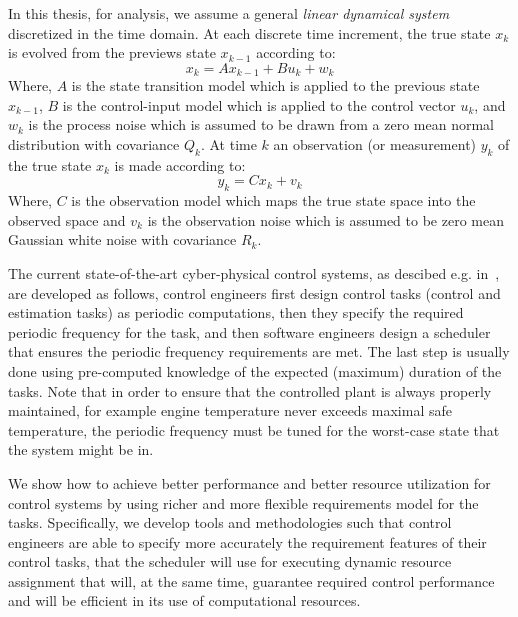 \documentclass[ twoside, 12pt ]{article}
\begin{document}
In this thesis, for analysis, we assume a general \textit{linear dynamical system} discretized in the time domain.
At each discrete time increment, the true state $x_k$ is evolved from the previews state $x_{k-1}$ according to:
$$ x_{k}=Ax_{k-1} + Bu_{k} + w_{k} $$
Where,
$A$ is the state transition model which is applied to the previous state $x_{k−1}$, $B$ is the control-input model which is applied to the control vector $u_k$, and $w_k$ is the process noise which is assumed to be drawn from a zero mean normal distribution with covariance $Q_k$.
At time $k$ an observation (or measurement) $y_k$ of the true state $x_k$ is made according to:
$$y_k=Cx_k+v_k$$
Where,
$C$ is the observation model which maps the true state space into the observed space and $v_k$ is the observation noise which is assumed to be zero mean Gaussian white noise with covariance $R_k$.

The current state-of-the-art cyber-physical control systems, as descibed e.g. in~\cite{Celvin}, are developed as follows, control engineers first design control tasks (control and estimation tasks) as periodic computations, then they specify the required periodic frequency for the task, and then software engineers design a scheduler that ensures the periodic frequency requirements are met. 
The last step is usually done using pre-computed knowledge of the expected (maximum) duration of the tasks.
Note that in order to ensure that the controlled plant is always properly maintained, for example engine temperature never exceeds maximal safe temperature, the periodic frequency must be tuned for the worst-case state that the system might be in.

We show how to achieve better performance and better resource utilization for control systems by using richer and more flexible requirements model for the tasks.
Specifically, we develop tools and methodologies such that control engineers are able to specify more accurately the requirement features of their control tasks, that the scheduler will use for executing dynamic resource assignment that will, at the same time, guarantee required control performance and will be efficient in its use of computational resources. 
\end{document}
